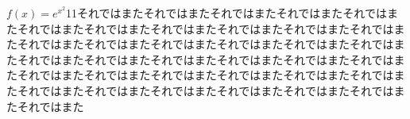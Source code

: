 \documentclass{jarticle}
\begin{document}
$f(x)=e^{x^2}$11それではまたそれではまたそれではまたそれではまたそれではまたそれではまたそれではまたそれではまたそれではまたそれではまたそれではまたそれではまたそれではまたそれではまたそれではまたそれではまたそれではまたそれではまたそれではまたそれではまたそれではまたそれではまたそれではまたそれではまたそれではまたそれではまたそれではまたそれではまたそれではまたそれではまたそれではまたそれではまたそれではまたそれではまたそれではまたそれではまた
\end{document}
